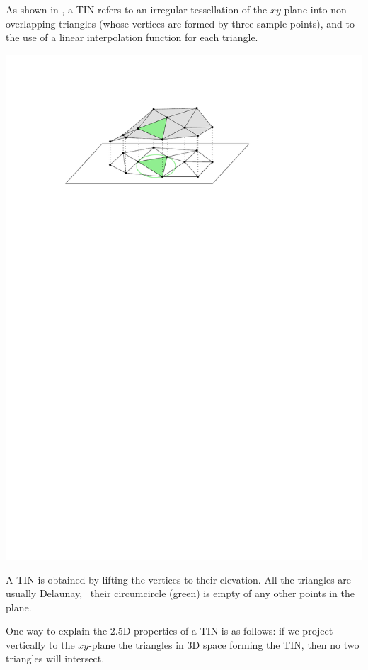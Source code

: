 As shown in , a TIN refers to an irregular tessellation of the $xy$-plane into non-overlapping triangles (whose vertices are formed by three sample points), and to the use of a linear interpolation function for each triangle. 
\begin{marginfigure}
  \includegraphics{figs/tin}
  \caption{A TIN is obtained by lifting the vertices to their elevation. All the triangles are usually Delaunay, \ie\ their circumcircle (green) is empty of any other points in the plane.}%
\end{marginfigure}
One way to explain the 2.5D properties of a TIN is as follows: if we project vertically to the $xy$-plane the triangles in 3D space forming the TIN, then no two triangles will intersect.

